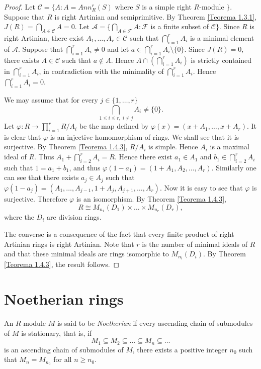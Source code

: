 \begin{proof}
Let $\mathcal{C}=\{ A : A=Ann^r_R(S)$ where $S$ is a simple right $R$-module $\}$. Suppose that $R$ is right Artinian and semiprimitive.
By Theorem \ref{Teorema 1.3.1}, $J(R)=\bigcap_{A\in\mathcal{C}}A=0$. Let $\mathcal{A}=\{\bigcap_{A\in \mathcal{F}}A  : \mathcal{F}$ is a finite subset of $\mathcal{C}\}$. Since $R$ is right Artinian, there exist $A_1,\dots,A_r\in \mathcal{C}$ such that
$\bigcap_{i=1}^rA_i$ is a minimal element of $\mathcal{A}$. Suppose that
$\bigcap_{i=1}^rA_i\neq 0$ and let $a\in\bigcap_{i=1}^rA_i\setminus\{ 0\}$.
Since $J(R)=0$, there exists $A\in \mathcal{C}$ such that $a\notin A$. Hence $A\cap (\bigcap_{i=1}^rA_i)$ is strictly contained in $\bigcap_{i=1}^rA_i$, in contradiction with the minimality of $\bigcap_{i=1}^rA_i$. Hence $\bigcap_{i=1}^rA_i=0$.

We may assume that for every $j\in\{ 1,\dots ,r\}$  
$$\bigcap_{1\leq i\leq r,\;
i\neq j}A_i\neq \{0\}.$$
Let $\varphi\colon R\rightarrow \prod_{i=1}^rR/A_i$ be the map defined by
$\varphi(x)=(x+A_1,\dots,x+A_r)$. It is clear that $\varphi$ is an injective homomorphism of rings. We shall see that it is surjective. By Theorem \ref{Teorema 1.4.3},
$R/A_i$ is simple. Hence $A_i$ is a maximal ideal of $R$. Thus
$A_1+\bigcap_{i=2}^rA_i=R$. Hence there exist $a_1\in A_1$ and
$b_1\in\bigcap_{i=2}^rA_i$ such that $1=a_1+b_1$, and thus $\varphi
(1-a_1)=(1+A_1,A_2,\dots ,A_r)$. Similarly one can see that there exists $a_j\in A_j$ such that
$\varphi(1-a_j)=(A_1,\dots ,A_{j-1},1+A_j,A_{j+1},\dots, A_r)$. Now it is easy to see that $\varphi$ is surjective.
Therefore $\varphi$ is an isomorphism. By Theorem \ref{Teorema 1.4.3},
$$R\cong M_{n_1}(D_1)\times\dots\times M_{n_r}(D_r),$$
where the $D_i$ are division rings.

The converse is a consequence of the fact that every finite product of right Artinian rings is right Artinian. 
Note that  $r$ is the number of minimal ideals of $R$ and that these minimal ideals are rings isomorphic to $M_{n_i}(D_i)$.
By Theorem \ref{Teorema 1.4.3}, the result follows.
\end{proof}

\section{Noetherian rings}
An $R$-module $M$ is said to be \emph{Noetherian} if every ascending chain of submodules of $M$ is stationary, that is, if
$$M_1\subseteq M_2\subseteq\dots\subseteq M_n\subseteq\dots$$
is an ascending chain of submodules of $M$, there exists a positive integer $n_0$ such that $M_n=M_{n_0}$ for all $n\geq n_0$.

